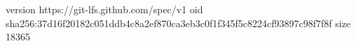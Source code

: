 version https://git-lfs.github.com/spec/v1
oid sha256:37d16f20182c051ddb4c8a2ef870ca3eb3c0f1f345f5c8224cf93897c98f7f8f
size 18365
